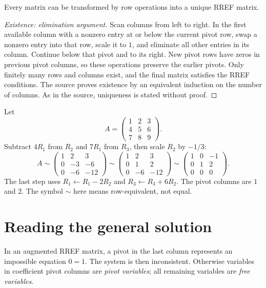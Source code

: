 \begin{theorem}
Every matrix can be transformed by row operations into a unique RREF matrix.
\end{theorem}
\begin{proof}[Existence: elimination argument]
Scan columns from left to right. In the first available column with a nonzero
entry at or below the current pivot row, swap a nonzero entry into that row,
scale it to $1$, and eliminate all other entries in its column. Continue
below that pivot and to its right. New pivot rows have zeros in previous
pivot columns, so these operations preserve the earlier pivots.
Only finitely many rows and columns exist, and the final matrix satisfies
the RREF conditions. The source proves existence by an equivalent induction
on the number of columns. As in the source, uniqueness is stated without proof.
\end{proof}

\begin{example}\label{ex:algebra-rref}
Let
\[
A=\begin{pmatrix}1&2&3\\4&5&6\\7&8&9\end{pmatrix}.
\]
Subtract $4R_1$ from $R_2$ and $7R_1$ from $R_3$, then scale $R_2$ by
$-1/3$:
\[
A\sim\begin{pmatrix}1&2&3\\0&-3&-6\\0&-6&-12\end{pmatrix}
\sim\begin{pmatrix}1&2&3\\0&1&2\\0&-6&-12\end{pmatrix}
\sim\begin{pmatrix}1&0&-1\\0&1&2\\0&0&0\end{pmatrix}.
\]
The last step uses $R_1\leftarrow R_1-2R_2$ and $R_3\leftarrow R_3+6R_2$.
The pivot columns are $1$ and $2$. The symbol $\sim$ here means
row-equivalent, not equal.
\end{example}

\section{Reading the general solution}
In an augmented RREF matrix, a pivot in the last column represents an
impossible equation $0=1$. The system is then inconsistent.
Otherwise variables in coefficient pivot columns are \emph{pivot variables};
all remaining variables are \emph{free variables}.

